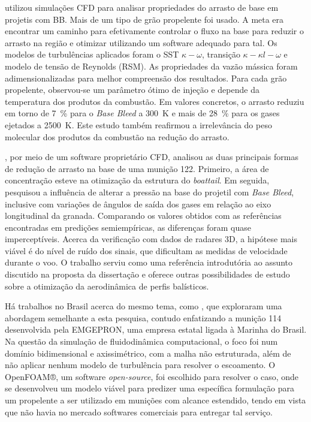 \citeauthor{Dali2018a} utilizou simulações CFD para analisar propriedades do arrasto de base em projetis com BB. Mais de um tipo de grão propelente foi usado. A meta era encontrar um caminho para efetivamente controlar o fluxo na base para reduzir o arrasto na região e otimizar utilizando um software adequado para tal. Os modelos de turbulências aplicados foram o SST \(\kappa-\omega\), transição $\kappa-\kappa l-\omega$ e modelo de tensão de Reynolds (RSM). As propriedades da vazão mássica foram adimensionalizadas para melhor compreensão dos resultados. Para cada grão propelente, observou-se um parâmetro ótimo de injeção e depende da temperatura dos produtos da combustão. Em valores concretos, o arrasto reduziu em torno de \qty{7}{\percent} para o \textit{Base Bleed} a \qty{300}{\kelvin} e mais de \qty{28}{\percent} para os gases ejetados a \qty{2500}{\kelvin}. Este estudo também reafirmou a irrelevância do peso molecular dos produtos da combustão na redução do arrasto.
	
\citeauthor{Dali2018b}, por meio de um software proprietário CFD, analisou as duas principais formas de redução de arrasto na base de uma munição \qty{122}{\millimetre}. Primeiro, a área de concentração esteve na otimização da estrutura do \textit{boattail}. Em seguida, pesquisou a influência de alterar a pressão na base do projetil com \textit{Base Bleed}, inclusive com variações de ângulos de saída dos gases em relação ao eixo longitudinal da granada. Comparando os valores obtidos com as referências encontradas em predições semiempíricas, as diferenças foram quase imperceptíveis. Acerca da verificação com dados de radares 3D, a hipótese mais viável é do nível de ruído dos sinais, que dificultam as medidas de velocidade durante o voo. O trabalho serviu como uma referência introdutória ao assunto discutido na proposta da dissertação e oferece outras possibilidades de estudo sobre a otimização da aerodinâmica de perfis balísticos. 
	
Há trabalhos no Brasil acerca do mesmo tema, como \cite{Lucena2020,Rosendo2020,Gil2020}, que exploraram uma abordagem semelhante a esta pesquisa, contudo enfatizando a munição \qty{114}{\millimetre} desenvolvida pela EMGEPRON, uma empresa estatal ligada à Marinha do Brasil. Na questão da simulação de fluidodinâmica computacional, o foco foi num domínio bidimensional e axissimétrico, com a malha não estruturada, além de não aplicar nenhum modelo de turbulência para resolver o escoamento. O OpenFOAM®, um software \textit{open-source}, foi escolhido para resolver o caso, onde se desenvolveu um modelo viável para predizer uma específica formulação para um propelente a ser utilizado em munições com alcance estendido, tendo em vista que não havia no mercado softwares comerciais para entregar tal serviço. 

